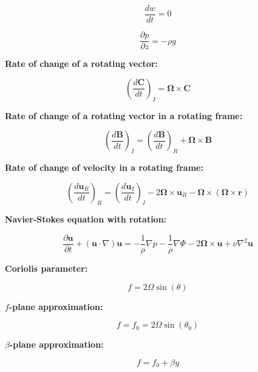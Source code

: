 \documentclass[12pt]{article}
\numberwithin{equation}{section}
\numberwithin{figure}{section}
\numberwithin{table}{section}
\begin{document}
\begin{equation}
  \frac{dw}{dt} = 0
\end{equation}

\begin{equation}
  \frac{\partial p}{\partial z} = -\rho g
\end{equation}

\textbf{Rate of change of a rotating vector:}

\begin{equation}
  \left(\frac{d\mathbf{C}}{dt}\right)_I = \mathbf{\Omega} \times \mathbf{C}
\end{equation}

\textbf{Rate of change of a rotating vector in a rotating frame:}

\begin{equation}
  \left(\frac{d\mathbf{B}}{dt}\right)_I = \left(\frac{d\mathbf{B}}{dt}\right)_R + \mathbf{\Omega} \times \mathbf{B}
\end{equation}

\textbf{Rate of change of velocity in a rotating frame:}

\begin{equation}
  \left( \frac{d \mathbf{u}_R}{dt} \right)_R =
  \left( \frac{d \mathbf{u}_I}{dt} \right)_I -
  2 \mathbf{\Omega} \times \mathbf{u}_R -
  \mathbf{\Omega} \times \left( \mathbf{\Omega} \times \mathbf{r} \right)
\end{equation}

\textbf{Navier-Stokes equation with rotation:}

\begin{equation}
  \frac{\partial \mathbf{u}}{\partial t} +
  \left( \mathbf{u} \cdot \nabla \right) \mathbf{u} =
  - \frac{1}{\rho} \nabla p
  - \frac{1}{\rho} \nabla \Phi
  - 2 \mathbf{\Omega} \times \mathbf{u}
  + \nu \nabla^2 \mathbf{u}
\end{equation}

\textbf{Coriolis parameter:}

\begin{equation}
  f = 2 \Omega \sin(\theta)
\end{equation}

\textbf{$f$-plane approximation:}

\begin{equation}
  f = f_0 = 2 \Omega \sin(\theta_0)
\end{equation}

\textbf{$\beta$-plane approximation:}

\begin{equation}
  f = f_0 + \beta y
\end{equation}
\end{document}
